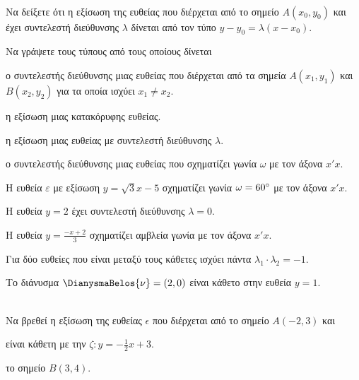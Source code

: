 \documentclass[twoside,nofonts,ektypwsh]{frontisthrio-diag}
\begin{document}
\begin{thema}
\item\mbox{}\\\vspace{-7mm}
\begin{erwthma}
\item Να δείξετε ότι η εξίσωση της ευθείας που διέρχεται από το σημείο $ A(x_0,y_0) $ και έχει συντελεστή διεύθυνσης $ \lambda $ δίνεται από τον τύπο $ y-y_0=\lambda(x-x_0) $.\\
\item Να γράψετε τους τύπους από τους οποίους δίνεται
\begin{alist}
\item ο συντελεστής διεύθυνσης μιας ευθείας που διέρχεται από τα σημεία $ A(x_1,y_1) $ και $ B(x_2,y_2) $ για τα οποία ισχύει $ x_1\neq x_2 $.
\item η εξίσωση μιας κατακόρυφης ευθείας.
\item η εξίσωση μιας ευθείας με συντελεστή διεύθυνσης $ \lambda $.
\item ο συντελεστής διεύθυνσης μιας ευθείας που σχηματίζει γωνία $ \omega $ με τον άξονα $ x'x $.
\end{alist}
\item \swstolathos
\begin{alist}
\item Η ευθεία $ \varepsilon $ με εξίσωση $ y=\sqrt{3}x-5 $ σχηματίζει γωνία $ \omega=60\degree $ με τον άξονα $ x'x $.
\item Η ευθεία $ y=2 $ έχει συντελεστή διεύθυνσης $ \lambda=0 $.
\item Η ευθεία $ y=\frac{-x+2}{3} $ σχηματίζει αμβλεία γωνία με τον άξονα $ x'x $.
\item Για δύο ευθείες που είναι μεταξύ τους κάθετες ισχύει πάντα $ \lambda_1\cdot\lambda_2=-1 $.
\item Το διάνυσμα $ \DianysmaBelos{\nu}=(2,0) $ είναι κάθετο στην ευθεία $ y=1 $.
\end{alist}
\end{erwthma}
\item\mbox{}\\
Να βρεθεί η εξίσωση της ευθείας $ \epsilon $ που διέρχεται από το σημείο $ A(-2,3) $ και
\begin{erwthma}
\item είναι κάθετη με την $ \zeta: y=-\frac{1}{2}x+3 $.
\item το σημείο $ B(3,4) $.

\end{erwthma}
\end{thema}
\end{document}
